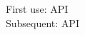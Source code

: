 \documentclass{article}
\begin{document}
\noindent
First use: \gls{API}\\
Subsequent: \gls{API}

\pagebreak
\printglossaries
\end{document}
